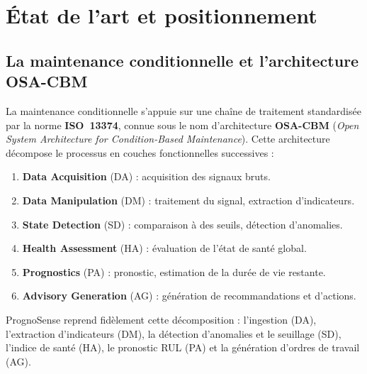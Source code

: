 \chapter{État de l'art et positionnement}
\label{chap:etatart}

\section{La maintenance conditionnelle et l'architecture OSA-CBM}
La maintenance conditionnelle s'appuie sur une chaîne de traitement standardisée par la
norme \textbf{ISO~13374}, connue sous le nom d'architecture \textbf{OSA-CBM} (\emph{Open
System Architecture for Condition-Based Maintenance}). Cette architecture décompose le
processus en couches fonctionnelles successives :
\begin{enumerate}[leftmargin=1.6em]
  \item \textbf{Data Acquisition} (DA) : acquisition des signaux bruts.
  \item \textbf{Data Manipulation} (DM) : traitement du signal, extraction d'indicateurs.
  \item \textbf{State Detection} (SD) : comparaison à des seuils, détection d'anomalies.
  \item \textbf{Health Assessment} (HA) : évaluation de l'état de santé global.
  \item \textbf{Prognostics} (PA) : pronostic, estimation de la durée de vie restante.
  \item \textbf{Advisory Generation} (AG) : génération de recommandations et d'actions.
\end{enumerate}
PrognoSense reprend fidèlement cette décomposition : l'ingestion (DA), l'extraction
d'indicateurs (DM), la détection d'anomalies et le seuillage (SD), l'indice de santé (HA),
le pronostic RUL (PA) et la génération d'ordres de travail (AG).

